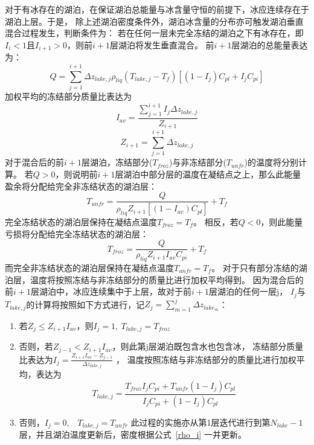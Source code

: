 对于有冰存在的湖泊，在保证湖泊总能量与冰含量守恒的前提下，冰应连续存在于湖泊上层。于是，
除上述湖泊密度条件外，湖泊冰含量的分布亦可触发湖泊垂直混合过程发生，判断条件为：
若在任何一层未完全冻结的湖泊之下有冰存在，即$I_i<1$且$I_{i+1}>0$，则前$i+1$层湖泊将发生垂直混合。
前$i+1$层湖泊的总能量表达为：
\begin{equation}
Q=\sum_{j=1}^{i+1} \Delta z_{lake, j} \rho_{liq}\left(T_{lake, j}-T_{f}\right)\left[\left(1-I_{j}\right) C_{p l}+I_{j} C_{p i}\right]
\end{equation}
加权平均的冻结部分质量比表达为
\begin{equation}
I_{a v}=\frac{\sum_{j=1}^{i+1} I_{j} \Delta z_{lake, j}}{Z_{i+1}}
\end{equation}
\begin{equation}
Z_{i+1}=\sum_{j=1}^{i+1} \Delta z_{lake, j}
\end{equation}
对于混合后的前$i+1$层湖泊，冻结部分($T_{froz}$)与非冻结部分($T_{unfr}$)的温度将分别计算。
若$Q>0$，则说明前$i+1$层湖泊中部分层的温度在凝结点之上，那么此能量盈余将分配给完全非冻结状态的湖泊层：
\begin{equation}
T_{unfr}=\frac{Q}{\rho_{liq} Z_{i+1}\left[\left(1-I_{av}\right) C_{pl}\right]}+T_{f}
\end{equation}
完全冻结状态的湖泊层保持在凝结点温度$T_{froz}=T_f$。
相反，若$Q<0$，则此能量亏损将分配给完全冻结状态的湖泊层：
\begin{equation}
T_{froz}=\frac{Q}{\rho_{liq} Z_{i+1} I_{a v} C_{p i}}+T_{f}
\end{equation}
而完全非冻结状态的湖泊层保持在凝结点温度$T_{unfr}=T_f$。
对于只有部分冻结的湖泊层，温度将按照冻结与非冻结部分的质量比进行加权平均得到。
因为混合后的前$i+1$层湖泊中，冰应连续集中于上层，故对于前$i+1$层湖泊的任何一层j，
$I_j$与$T_{lake,j}$的计算将按照如下方式进行，记${Z_j}=\sum_{m=1}^{j} \Delta z_{lake_m}$：\\
\begin{enumerate}
    \item 若$Z_j\leqslant Z_{i+1}I_{av}$，则$I_j=1,\ T_{lake,j}=T_{froz}$
    \item 否则，若$Z_{j-1}<Z_{i+1} I_{a v}$，则此第j层湖泊既包含水也包含冰，
    冻结部分质量比表达为$I_{j}=\frac{Z_{i+1} I_{a v}-Z_{j-1}}{\Delta z_{lake, j}}$ ，
    温度按照冻结与非冻结部分的质量比进行加权平均，表达为
    \begin{equation}
    T_{lake, j}=\frac{T_{f r o z} I_{j} C_{p i}+T_{u n f r}\left(1-I_{j}\right) C_{p l}}{I_{j} C_{p i}+\left(1-I_{j}\right) C_{p l}}
    \end{equation}
    \item 否则，$I_j=0$,\ \ $T_{lake,j}=T_{unfr}$
    此过程的实施亦从第1层迭代进行到第$N_{lake}-1$层，并且湖泊温度更新后，密度根据公式~\eqref{rho_i} 一并更新。
\end{enumerate}


